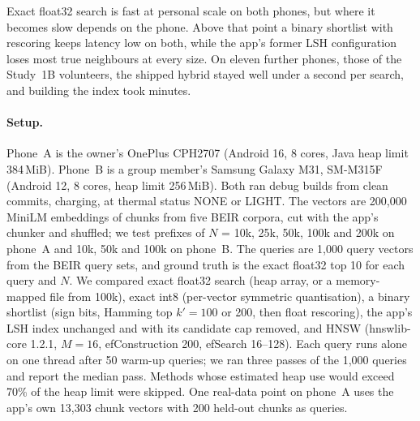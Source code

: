 \documentclass[11pt,a4paper]{article}
\begin{document}
Exact float32 search is fast at personal scale on both phones, but where it becomes slow depends on the phone. Above that point a binary shortlist with rescoring keeps latency low on both, while the app's former LSH configuration loses most true neighbours at every size. On eleven further phones, those of the Study~1B volunteers, the shipped hybrid stayed well under a second per search, and building the index took minutes.

\paragraph{Setup.} Phone~A is the owner's OnePlus CPH2707 (Android 16, 8 cores, Java heap limit 384\,MiB). Phone~B is a group member's Samsung Galaxy M31, SM-M315F (Android 12, 8 cores, heap limit 256\,MiB). Both ran debug builds from clean commits, charging, at thermal status NONE or LIGHT. The vectors are 200,000 MiniLM embeddings of chunks from five BEIR corpora, cut with the app's chunker and shuffled; we test prefixes of $N$ = 10k, 25k, 50k, 100k and 200k on phone~A and 10k, 50k and 100k on phone~B. The queries are 1,000 query vectors from the BEIR query sets, and ground truth is the exact float32 top 10 for each query and $N$. We compared exact float32 search (heap array, or a memory-mapped file from 100k), exact int8 (per-vector symmetric quantisation), a binary shortlist (sign bits, Hamming top $k'=100$ or 200, then float rescoring), the app's LSH index unchanged and with its candidate cap removed, and HNSW (hnswlib-core 1.2.1, $M=16$, efConstruction 200, efSearch 16--128). Each query runs alone on one thread after 50 warm-up queries; we ran three passes of the 1,000 queries and report the median pass. Methods whose estimated heap use would exceed 70\% of the heap limit were skipped. One real-data point on phone~A uses the app's own 13,303 chunk vectors with 200 held-out chunks as queries.
\end{document}
